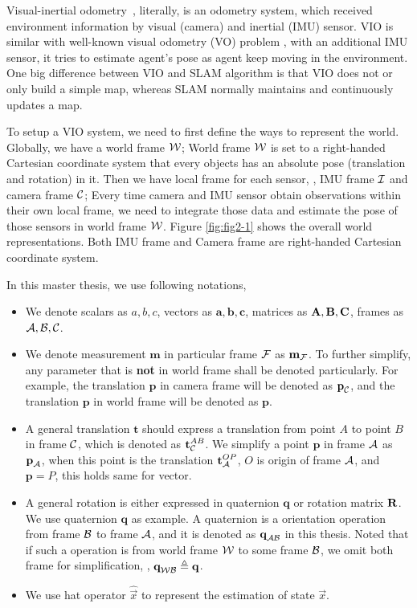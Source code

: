 Visual-inertial odometry~\cite{li2011consistency}, literally, is an odometry system, which received environment information by visual (camera) and inertial (IMU) sensor. VIO is similar with well-known visual odometry (VO) problem \cite{nister2004visual}, with an additional IMU sensor, it tries to estimate agent's pose as agent keep moving in the environment. One big difference between VIO and SLAM algorithm is that VIO does not or only build a simple map, whereas SLAM normally maintains and continuously updates a map.

To setup a VIO system, we need to first define the ways to represent the world. Globally, we have a world frame $\mathcal{W}$; World frame $\mathcal{W}$ is set to a right-handed Cartesian coordinate system that every objects has an absolute pose (translation and rotation) in it. Then we have local frame for each sensor, \ie, IMU frame $\mathcal{I}$ and camera frame $\mathcal{C}$; Every time camera and IMU sensor obtain observations within their own local frame, we need to integrate those data and estimate the pose of those sensors in world frame $\mathcal{W}$. Figure \ref{fig:fig2-1} shows the overall world representations. Both IMU frame and Camera frame are right-handed Cartesian coordinate system.

In this master thesis, we use following notations,
\begin{itemize}
\item {We denote scalars as $a, b, c$, vectors as $\textbf{a}, \textbf{b}, \textbf{c}$, matrices as $\mathbf{A}, \mathbf{B}, \mathbf{C}$, frames as $\mathcal{A}, \mathcal{B}, \mathcal{C}$.}
\item {We denote measurement $\textbf{m}$ in particular frame $\mathcal{F}$ as $\textbf{m}_{\mathcal{F}}$. To further simplify, any parameter that is \textbf{not} in world frame shall 
be denoted particularly. For example, the translation $\textbf{p}$ in camera frame will be denoted as $\textbf{p}_{\mathcal{C}}$, and the translation $\textbf{p}$ in world frame will be denoted as $\textbf{p}$. }
\item {A general translation $\textbf{t}$ should express a translation from point $A$ to point $B$ in frame $\mathcal{C}$, which is denoted as $\textbf{t}^{AB}_{\mathcal{C}}$. We simplify a point $\textbf{p}$ in frame $\mathcal{A}$ as $\textbf{p}_{\mathcal{A}}$, when this point is the translation $\textbf{t}^{OP}_{\mathcal{A}}$, $O$ is origin of frame $\mathcal{A}$, and $\textbf{p} = P$, this holds same for vector.}
\item {A general rotation is either expressed in quaternion $\textbf{q}$ or rotation matrix $\mathbf{R}$. We use quaternion $\textbf{q}$ as example. A quaternion is a  orientation operation from frame $\mathcal{B}$ to frame $\mathcal{A}$, and it is denoted as $\textbf{q}_{\mathcal{A}\mathcal{B}}$  in this thesis. Noted that if such a operation is from world frame $\mathcal{W}$ to some frame $\mathcal{B}$, we omit both frame for simplification, \ie, $\textbf{q}_{\mathcal{W}\mathcal{B}} \triangleq \textbf{q}$.}
\item {We use hat operator $\hat{\vec{x}}$ to represent the estimation of state $\vec{x}$.}
\end{itemize}

